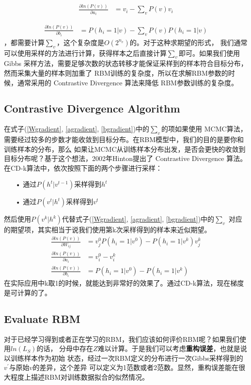 \documentclass[UTF8]{ctexart}
\begin{document}
\begin{align}
\label{agradient}
\frac{\partial ln(P(v))}{\partial a_i} 
&= v_i - \sum_v P(v) v_i
\end{align}

\begin{align}
\label{bgradient}
\frac{\partial ln(P(v))}{\partial b_i} 
&= P(h_i=1|v) - \sum_v P(v) P(h_i=1|v)
\end{align}
，都需要计算$\sum_v$，这个复杂度是$O(2^{n_v})$的。对于这种求期望的形式，
我们通常可以使用采样的方法进行计算，获得样本之后直接计算$\sum_v$即可。如果我们使用Gibbs
采样方法，需要足够次数的状态转移才能保证采样到的样本符合目标分布，然而采集大量的样本则加重了
RBM训练的复杂度，所以在求解RBM参数的时候，通常采用的 Contrastive Divergence 算法来降低
RBM参数训练的复杂度。

\subsection{Contrastive Divergence Algorithm}
在式子(\ref{Wgradient}, \ref{agradient}, \ref{bgradient})中的$\sum_v$的项如果使用
MCMC算法，需要经过较多的步数才能收敛到目标分布。在RBM模型中，我们的目的是要你和训练样本的分布，那么
如果让MCMC从训练样本分布出发，是否会更快的收敛到目标分布呢？基于这个想法，2002年Hinton提出了 Contrastive
Divergence 算法。
在CD-k算法中，依次按照下面的两个步骤进行采样：
\begin{itemize}
\item[•] 通过$P(h^t|v^{t-1})$采样得到$h^t$
\item[•] 通过$P(v^t|h^t)$采样得到$v^t$
\end{itemize}
然后使用$P(v^k|h^k)$代替式子(\ref{Wgradient}, \ref{agradient}, \ref{bgradient})中的$\sum_v$
对应的期望项，其实相当于说我们使用第k次采样得到的样本来近似期望。
\begin{align}
\frac{\partial ln(P(v))}{\partial W_{ij}} 
&= v_j^0 P(h_i=1|v^0) - P(h_i=1|v^k)v_j^k
\\
\frac{\partial ln(P(v))}{\partial a_i} 
&= v_i^0 - v_i^k
\\
\frac{\partial ln(P(v))}{\partial b_i} 
&= P(h_i=1|v^0) - P(h_i=1|v^k)
\end{align}
在实际应用中k取1的时候，就能达到非常好的效果了。通过CD-k算法，现在梯度是可计算的了。

\subsection{Evaluate RBM}
对于已经学习得到或者正在学习的RBM，我们应该如何评价RBM呢？如果我们使用$ln(L_S)$的话，
分母中存在$Z$难以计算。于是我们可以考虑\textbf{重构误差}，也就是说以训练样本作为初始
状态，经过一次RBM定义的分布进行一次Gibbs采样得到的$v^{'}$与原始$v$的差异，这个差异
可以定义为1范数或者2范数。显然，重构误差能在很大程度上描述RBM对训练数据拟合的似然情况。
\end{document}
